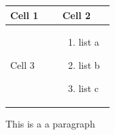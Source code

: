 \par\medskip
\begin{longtable}{|p{0.45\linewidth}|p{0.45\linewidth}|}
\hline
Cell 1

 & Cell 2

 \\
\hline
Cell 3

 & \begin{enumerate}\item list a



\item list b



\item list c



\end{enumerate} \\
\hline
\end{longtable}
\medskip
This is a a paragraph



